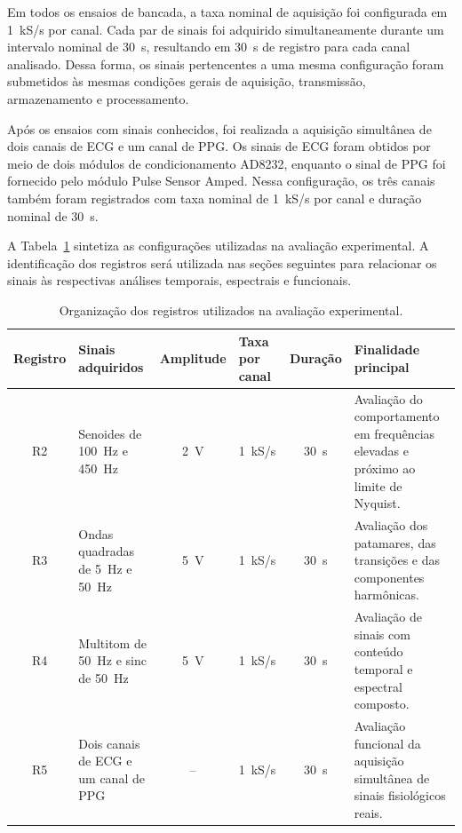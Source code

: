 \documentclass[a4paper,12pt]{fcte}
\begin{document}
Em todos os ensaios de bancada, a taxa nominal de aquisição foi configurada em 1~kS/s por canal. Cada par de sinais foi adquirido simultaneamente durante um intervalo nominal de 30~s, resultando em 30~s de registro para cada canal analisado. Dessa forma, os sinais pertencentes a uma mesma configuração foram submetidos às mesmas condições gerais de aquisição, transmissão, armazenamento e processamento.

Após os ensaios com sinais conhecidos, foi realizada a aquisição simultânea de dois canais de ECG e um canal de PPG. Os sinais de ECG foram obtidos por meio de dois módulos de condicionamento AD8232, enquanto o sinal de PPG foi fornecido pelo módulo Pulse Sensor Amped. Nessa configuração, os três canais também foram registrados com taxa nominal de 1~kS/s por canal e duração nominal de 30~s.

A Tabela~\ref{tab:organizacao_registros} sintetiza as configurações utilizadas na avaliação experimental. A identificação dos registros será utilizada nas seções seguintes para relacionar os sinais às respectivas análises temporais, espectrais e funcionais.

\begin{table}[!htbp]
    \centering
    \caption{Organização dos registros utilizados na avaliação experimental.}
    \label{tab:organizacao_registros}
    \small
    \begin{tabularx}{\linewidth}{c p{2.3cm} c p{1.8cm} c X}
        \hline
        \textbf{Registro} &
        \textbf{Sinais \mbox{adquiridos}} &
        \textbf{Amplitude} &
        \textbf{Taxa por canal} &
        \textbf{Duração} &
        \textbf{Finalidade principal} \\
        \hline

        R2 &
        Senoides de 100~Hz e 450~Hz &
        2~V &
        1~kS/s &
        30~s &
        Avaliação do comportamento em frequências elevadas e próximo ao limite
        de Nyquist. \\

        R3 &
        Ondas quadradas de 5~Hz e 50~Hz &
        5~V &
        1~kS/s &
        30~s &
        Avaliação dos patamares, das transições e das componentes harmônicas. \\

        R4 &
        Multitom de 50~Hz e sinc de 50~Hz &
        5~V &
        1~kS/s &
        30~s &
        Avaliação de sinais com conteúdo temporal e espectral composto. \\

        R5 &
        Dois canais de ECG e um canal de PPG &
        -- &
        1~kS/s &
        30~s &
        Avaliação funcional da aquisição simultânea de sinais fisiológicos reais. \\

        \hline
    \end{tabularx}
\end{table}
\end{document}
